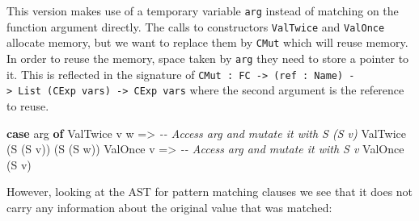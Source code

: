 \documentclass[
]{article}
\newenvironment{Shaded}{}{}
\newcommand{\CommentTok}[1]{\textcolor[rgb]{0.38,0.63,0.69}{\textit{#1}}}
\newcommand{\DataTypeTok}[1]{\textcolor[rgb]{0.56,0.13,0.00}{#1}}
\newcommand{\KeywordTok}[1]{\textcolor[rgb]{0.00,0.44,0.13}{\textbf{#1}}}
\newcommand{\NormalTok}[1]{#1}
\newcommand{\OtherTok}[1]{\textcolor[rgb]{0.00,0.44,0.13}{#1}}
\begin{document}
This version makes use of a temporary variable \texttt{arg} instead of
matching on the function argument directly. The calls to constructors
\texttt{ValTwice} and \texttt{ValOnce} allocate memory, but we want to
replace them by \texttt{CMut} which will reuse memory. In order to reuse
the memory, space taken by \texttt{arg} they need to store a pointer to
it. This is reflected in the signature of
\texttt{CMut\ :\ FC\ -\textgreater{}\ (ref\ :\ Name)\ -\textgreater{}\ List\ (CExp\ vars)\ -\textgreater{}\ CExp\ vars}
where the second argument is the reference to reuse.

\begin{Shaded}
\begin{Highlighting}[]
\KeywordTok{case}\NormalTok{ arg }\KeywordTok{of}
     \DataTypeTok{ValTwice}\NormalTok{ v w }\OtherTok{=\textgreater{}} \CommentTok{{-}{-} Access \textasciigrave{}arg\textasciigrave{} and mutate it with S (S v)}
                     \DataTypeTok{ValTwice}\NormalTok{ (}\DataTypeTok{S}\NormalTok{ (}\DataTypeTok{S}\NormalTok{ v)) (}\DataTypeTok{S}\NormalTok{ (}\DataTypeTok{S}\NormalTok{ w))}
     \DataTypeTok{ValOnce}\NormalTok{ v }\OtherTok{=\textgreater{}} \CommentTok{{-}{-} Access \textasciigrave{}arg\textasciigrave{} and mutate it with S v}
                  \DataTypeTok{ValOnce}\NormalTok{ (}\DataTypeTok{S}\NormalTok{ v)}
\end{Highlighting}
\end{Shaded}

However, looking at the AST for pattern matching clauses we see that it
does not carry any information about the original value that was
matched:
\end{document}
